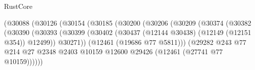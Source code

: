 \begin{lexlean}{RustCore}
\begin{coremodule}
                                                      (@30088
                                                        (@30126
                                                          (@30154
                                                            (@30185
                                                              (@30200
                                                                (@30206
                                                                  (@30209
                                                                    (@30374
                                                                      (@30382
                                                                        (@30390
                                                                          (@30393
                                                                            (@30399
                                                                              (@30402
                                                                                (@30437
                                                                                  (@12144 @30438)
                                                                                  (@12149
                                                                                    (@12151 @354))
                                                                                  @12499))
                                                                              @30271))
                                                                          (@12461
                                                                            (@19686 @77 @5811)))
                                                                        (@29282
                                                                          @243
                                                                          @77
                                                                          @214
                                                                          @27
                                                                          @2348
                                                                          @2403
                                                                          @10159
                                                                          @12600
                                                                          @29426
                                                                          (@12461
                                                                            (@27741 @77 @10159))))))

\end{coremodule}
\end{lexlean}
